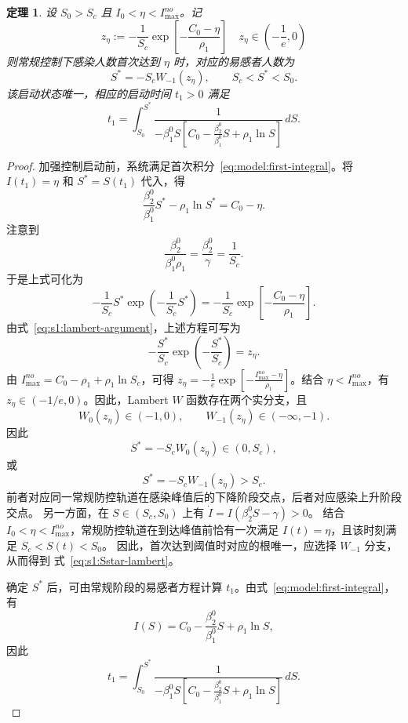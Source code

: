 \documentclass[UTF8,a4paper,10pt,fontset=fandol]{ctexart}
\theoremstyle{cnplain}
\newtheorem{theorem}{定理}[section]
\theoremstyle{remark}
\numberwithin{equation}{section}
\begin{document}
\begin{theorem}
\label{thm:s1:trigger}
设 $S_0>S_c$ 且 $I_0<\eta<I_{\max}^{no}$。记
\begin{equation}
z_\eta:=
-\frac{1}{S_c}
\exp\left[-\frac{C_0-\eta}{\rho_1}\right] \quad z_\eta\in\left(-\frac{1}{e},0\right)
\label{eq:s1:lambert-argument}
\end{equation}
则常规控制下感染人数首次达到 $\eta$ 时，对应的易感者人数为
\begin{equation}
S^*=-S_cW_{-1}(z_\eta),
\qquad
S_c<S^*<S_0.
\label{eq:s1:Sstar-lambert}
\end{equation}
该启动状态唯一，相应的启动时间 $t_1>0$ 满足
\begin{equation}
t_1
=
\int_{S_0}^{S^*}
\frac{1}{
-\beta_1^0S\left[
C_0-\frac{\beta_2^0}{\beta_1^0}S+\rho_1\ln S
\right]
}\,dS.
\label{eq:s1:t1}
\end{equation}
\end{theorem}
\begin{proof}
加强控制启动前，系统满足首次积分~\eqref{eq:model:first-integral}。将 $I(t_1)=\eta$ 和 $S^*=S(t_1)$ 代入，得
\[
\frac{\beta_2^0}{\beta_1^0}S^*-\rho_1\ln S^*
=C_0-\eta.
\]
注意到
\[
\frac{\beta_2^0}{\beta_1^0\rho_1}
=
\frac{\beta_2^0}{\gamma}
=
\frac{1}{S_c}.
\]
于是上式可化为
\[
-\frac{1}{S_c}S^*
\exp\left(-\frac{1}{S_c}S^*\right)
=
-\frac{1}{S_c}
\exp\left[-\frac{C_0-\eta}{\rho_1}\right].
\]
由式~\eqref{eq:s1:lambert-argument}，上述方程可写为
\[
-\frac{S^*}{S_c}
\exp\left(-\frac{S^*}{S_c}\right)
=z_\eta.
\]
由 $I_{\max}^{no}=C_0-\rho_1+\rho_1\ln S_c$，可得 $z_{\eta}=-\frac{1}{e}\exp\left[-\frac{I_{\max}^{no}-\eta}{\rho_1}\right]$。结合 $\eta<I_{\max}^{no}$，有 $z_\eta\in(-1/e,0)$。因此，Lambert $W$ 函数存在两个实分支，且
\[
W_0(z_\eta)\in(-1,0),
\qquad
W_{-1}(z_\eta)\in(-\infty,-1).
\]
因此
\[
S^*=-S_cW_0(z_\eta)\in(0,S_c),
\]
或
\[
S^*=-S_cW_{-1}(z_\eta)>S_c.
\]
前者对应同一常规防控轨道在感染峰值后的下降阶段交点，后者对应感染上升阶段交点。
另一方面，在 $S\in(S_c,S_0)$ 上有
$\dot I=I(\beta_2^0S-\gamma)>0$。
结合 $I_0<\eta<I_{\max}^{no}$，常规防控轨道在到达峰值前恰有一次满足
$I(t)=\eta$，且该时刻满足 $S_c<S(t)<S_0$。
因此，首次达到阈值时对应的根唯一，应选择 $W_{-1}$ 分支，从而得到
式~\eqref{eq:s1:Sstar-lambert}。

确定 $S^*$ 后，可由常规阶段的易感者方程计算 $t_1$。由式~\eqref{eq:model:first-integral}，有
\[
I(S)=
C_0-\frac{\beta_2^0}{\beta_1^0}S+\rho_1\ln S,
\]
因此
\[
t_1
=
\int_{S_0}^{S^*}
\frac{1}{
-\beta_1^0S\left[
C_0-\frac{\beta_2^0}{\beta_1^0}S+\rho_1\ln S
\right]
}\,dS.
\]

\end{proof}
\end{document}
